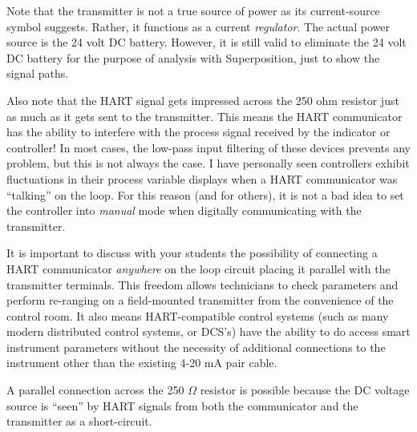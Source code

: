 





Note that the transmitter is not a true source of power as its current-source symbol suggests.  Rather, it functions as a current {\it regulator}.  The actual power source is the 24 volt DC battery.  However, it is still valid to eliminate the 24 volt DC battery for the purpose of analysis with Superposition, just to show the signal paths.

Also note that the HART signal gets impressed across the 250 ohm resistor just as much as it gets sent to the transmitter.  This means the HART communicator has the ability to interfere with the process signal received by the indicator or controller!  In most cases, the low-pass input filtering of these devices prevents any problem, but this is not always the case.  I have personally seen controllers exhibit fluctuations in their process variable displays when a HART communicator was ``talking'' on the loop.  For this reason (and for others), it is not a bad idea to set the controller into {\it manual} mode when digitally communicating with the transmitter.

\vskip 10pt

It is important to discuss with your students the possibility of connecting a HART communicator {\it anywhere} on the loop circuit placing it parallel with the transmitter terminals.  This freedom allows technicians to check parameters and perform re-ranging on a field-mounted transmitter from the convenience of the control room.  It also means HART-compatible control systems (such as many modern distributed control systems, or DCS's) have the ability to do access smart instrument parameters without the necessity of additional connections to the instrument other than the existing 4-20 mA pair cable.

A parallel connection across the 250 $\Omega$ resistor is possible because the DC voltage source is ``seen'' by HART signals from both the communicator and the transmitter as a short-circuit.




